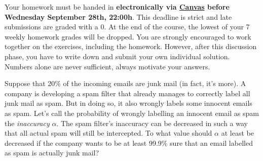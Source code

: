 \documentclass[a4paper,10pt,landscape,twocolumn]{scrartcl}
\newcommand\deadline{Wednesday September 28th, 22:00h}
\begin{document}
\homeworkproblems

{\sffamily\noindent
Your homework must be handed in \textbf{electronically via \href{\canvasURL}{Canvas} before \deadline}. 
This deadline is strict and late submissions are graded with a 0. At the end of the course, the lowest of your 7 weekly homework grades will be dropped. You are strongly encouraged to work together on the exercises, including the homework. However, after this discussion phase, you have to write down and submit your own individual solution. Numbers alone are never sufficient, always motivate your answers.
}



\begin{exercise}
	Suppose that 20\% of the incoming emails are junk mail (in fact, it's more). A company is developing a spam filter that already manages to correctly label all junk mail as spam. But in doing so, it also wrongly labels some innocent emails as spam. Let's call the probability of wrongly labelling an innocent email as spam the \emph{inaccuracy} $\alpha$. 
%	
	The spam filter's inaccuracy can be decreased in such a way that all actual spam will still be intercepted. To what value should $\alpha$ at least be decreased if the company wants to be at least 99.9\% sure that an email labelled as spam is actually junk mail?
\end{exercise}
\end{document}
